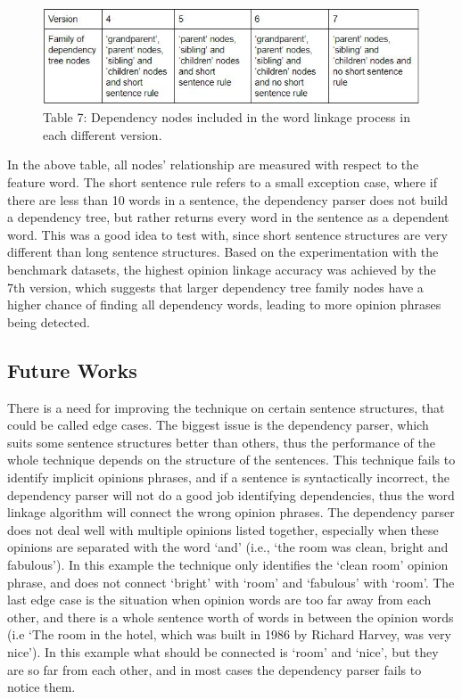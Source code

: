 \documentclass{sig-alternate}
\begin{document}
\begin{figure}
\centering
\includegraphics[scale=0.65]{images/table7.JPG}
Table 7: Dependency nodes included in the word linkage process in each different version.
\end{figure}

In the above table, all nodes' relationship are measured with respect to the feature word. The short sentence rule refers to a small exception case, where if there are less than 10 words in a sentence, the dependency parser does not build a dependency tree, but rather returns every word in the sentence as a dependent word. This was a good idea to test with, since short sentence structures are very different than long sentence structures. Based on the experimentation with the benchmark datasets, the highest opinion linkage accuracy was achieved by the 7th version, which suggests that larger dependency tree family nodes have a higher chance of finding all dependency words, leading to more opinion phrases being detected.

\subsection{Future Works}
There is a need for improving the technique on certain sentence structures, that could be called edge cases. The biggest issue is the dependency parser, which suits some sentence structures better than others, thus the performance of the whole technique depends on the structure of the sentences. This technique fails to identify implicit opinions phrases, and if a sentence is syntactically incorrect, the dependency parser will not do a good job identifying dependencies, thus the word linkage algorithm will connect the wrong opinion phrases. The dependency parser does not deal well with multiple opinions listed together, especially when these opinions are separated with the word `and' (i.e., `the room was clean, bright and fabulous'). In this example the technique only identifies the `clean room' opinion phrase, and does not connect `bright' with `room' and `fabulous' with `room'. The last edge case is the situation when opinion words are too far away from each other, and there is a whole sentence worth of words in between the opinion words (i.e `The room in the hotel, which was built in 1986 by Richard Harvey, was very nice'). In this example what should be connected is `room' and `nice', but they are so far from each other, and in most cases the dependency parser fails to notice them.
\end{document}

